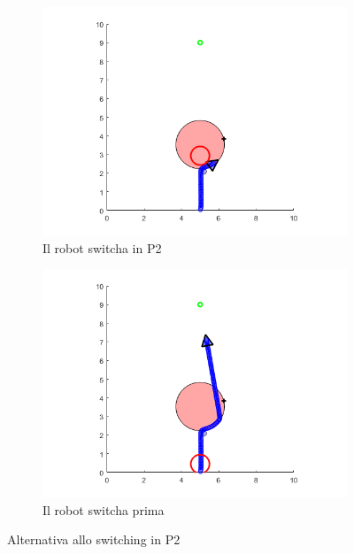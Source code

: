 \documentclass[14pt,a4paper]{extarticle}
\begin{document}
\begin{figure}[H]
\begin{subfigure}[t]{0.5\textwidth}
\centering
\caption{Il robot switcha in P2}
\label{nongiraprima}
\includegraphics[width=\textwidth]{hmax_2.png}
\end{subfigure}
\hfill
\begin{subfigure}[t]{0.5\textwidth}
\centering
\caption{Il robot switcha prima}
\label{giraprima}
\includegraphics[width=\textwidth]{giraprima.png}
\end{subfigure}
\caption{Alternativa allo switching in P2}
\label{snapshot1}
\end{figure}
\end{document}

